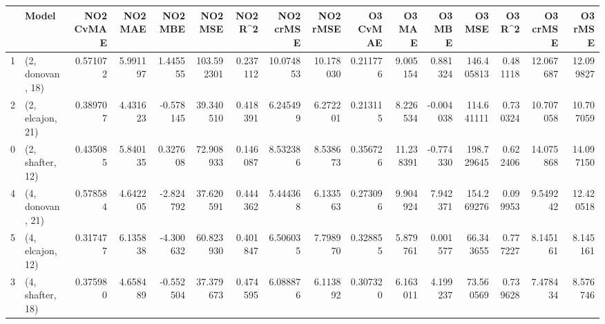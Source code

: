 \begin{tabular}{llrrrrrrrrrrrrrr}
\toprule
{} &             Model &  NO2 CvMAE &   NO2 MAE &   NO2 MBE &     NO2 MSE &   NO2 R\textasciicircum2 &  NO2 crMSE &   NO2 rMSE &  O3 CvMAE &     O3 MAE &    O3 MBE &      O3 MSE &    O3 R\textasciicircum2 &   O3 crMSE &    O3 rMSE \\
\midrule
1 &  (2, donovan, 18) &   0.571072 &  5.991197 &  1.445555 &  103.592301 &  0.237112 &  10.074853 &  10.178030 &  0.211776 &   9.005154 &  0.881324 &  146.405813 &  0.481118 &  12.067687 &  12.099827 \\
2 &  (2, elcajon, 21) &   0.389707 &  4.431623 & -0.578145 &   39.340510 &  0.418391 &   6.245499 &   6.272201 &  0.213115 &   8.226534 & -0.004038 &  114.641111 &  0.730324 &  10.707058 &  10.707059 \\
0 &  (2, shafter, 12) &   0.435085 &  5.840135 &  0.327608 &   72.908933 &  0.146087 &   8.532386 &   8.538673 &  0.356726 &  11.238391 & -0.774330 &  198.729645 &  0.622406 &  14.075868 &  14.097150 \\
4 &  (4, donovan, 21) &   0.578584 &  4.642205 & -2.824792 &   37.620591 &  0.444362 &   5.444368 &   6.133563 &  0.273096 &   9.904924 &  7.942371 &  154.269276 &  0.099953 &   9.549242 &  12.420518 \\
5 &  (4, elcajon, 12) &   0.317477 &  6.135838 & -4.300632 &   60.823930 &  0.401847 &   6.506035 &   7.798970 &  0.328855 &   5.879761 &  0.001577 &   66.343655 &  0.777227 &   8.145161 &   8.145161 \\
3 &  (4, shafter, 18) &   0.375980 &  4.658489 & -0.552504 &   37.379673 &  0.474595 &   6.088876 &   6.113892 &  0.307320 &   6.163011 &  4.199237 &   73.560569 &  0.739628 &   7.478434 &   8.576746 \\
\bottomrule
\end{tabular}
